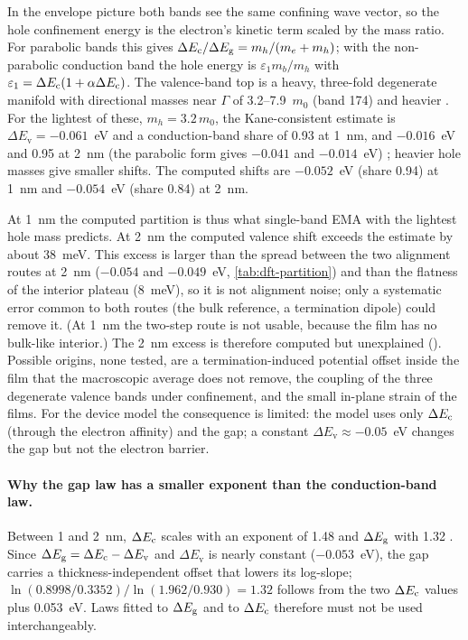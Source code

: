 In the envelope picture both bands see the same confining wave vector, so the hole confinement energy is the electron's
kinetic term scaled by the mass ratio. For parabolic bands this gives $\Delta E_{\mathrm{c}}/\Delta E_{\mathrm{g}} = m_h/(m_e+m_h)$; with the
non-parabolic conduction band the hole energy is $\varepsilon_1 m_b/m_h$ with $\varepsilon_1 = \Delta E_{\mathrm{c}}(1+\alpha\Delta E_{\mathrm{c}})$. The
\InO{} valence-band top is a heavy, three-fold degenerate manifold with directional masses near $\Gamma$ of
3.2--7.9~$m_0$ (band 174) and heavier . For the lightest of these, $m_h = 3.2\,m_0$, the Kane-consistent
estimate is $\Delta E_{\mathrm{v}} = -0.061$~eV and a conduction-band share of 0.93 at 1~nm, and $-0.016$~eV and 0.95 at
2~nm (the parabolic form gives $-0.041$ and $-0.014$~eV) ; heavier hole masses give smaller shifts. The
computed shifts are $-0.052$~eV (share 0.94) at 1~nm and $-0.054$~eV (share 0.84) at 2~nm.

At 1~nm the computed partition is thus what single-band EMA with the lightest hole mass predicts. At 2~nm the computed
valence shift exceeds the estimate by about 38~meV. This excess is larger than the spread between the two alignment
routes at 2~nm ($-0.054$ and $-0.049$~eV, \cref{tab:dft-partition}) and than the flatness of the interior plateau
(8~meV), so it is not alignment noise; only a systematic error common to both routes (the bulk reference, a
termination dipole) could remove it. (At 1~nm the two-step route is not usable, because the film has no bulk-like
interior.) The 2~nm excess is therefore computed but unexplained (). Possible origins, none tested, are a termination-induced potential
offset inside the film that the macroscopic average does not remove, the coupling of the three degenerate valence bands
under confinement, and the small in-plane strain of the films. For the device model the consequence is limited: the
model uses only $\Delta E_{\mathrm{c}}$ (through the electron affinity) and the gap; a constant $\Delta E_{\mathrm{v}}\approx-0.05$~eV
changes the gap but not the electron barrier.

\paragraph{Why the gap law has a smaller exponent than the conduction-band law.} Between 1 and 2~nm, $\Delta E_{\mathrm{c}}$ scales
with an exponent of 1.48 and $\Delta E_{\mathrm{g}}$ with 1.32 . Since $\Delta E_{\mathrm{g}} = \Delta E_{\mathrm{c}} - \Delta E_{\mathrm{v}}$ and
$\Delta E_{\mathrm{v}}$ is nearly constant ($-0.053$~eV), the gap carries a thickness-independent offset that lowers its
log-slope; $\ln(0.8998/0.3352)/\ln(1.962/0.930) = 1.32$ follows from the two $\Delta E_{\mathrm{c}}$ values plus 0.053~eV. Laws fitted
to $\Delta E_{\mathrm{g}}$ and to $\Delta E_{\mathrm{c}}$ therefore must not be used interchangeably.

